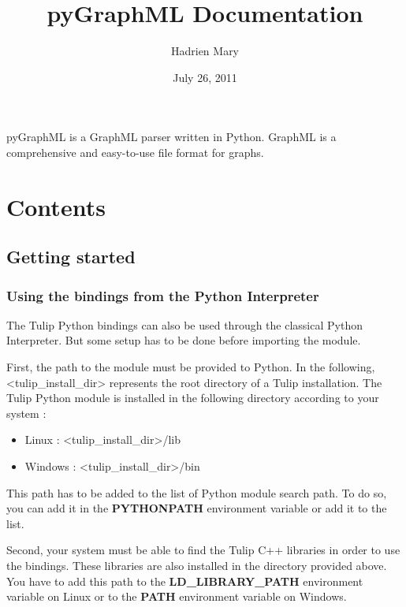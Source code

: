 \documentclass[letterpaper,10pt,english]{sphinxmanual}
\title{pyGraphML Documentation}
\date{July 26, 2011}
\author{Hadrien Mary}
\begin{document}
\maketitle
\tableofcontents
{}\label{index::doc}


pyGraphML is a GraphML parser written in Python. GraphML is a
comprehensive and easy-to-use file format for graphs.


\chapter{Contents}
\label{index:welcome-to-pygraphml-documentation}\label{index:contents}

\section{Getting started}
\label{gettingstarted:getting-started}\label{gettingstarted::doc}

\subsection{Using the bindings from the Python Interpreter}
\label{gettingstarted:using-the-bindings-from-the-python-interpreter}
The Tulip Python bindings can also be used through the classical Python Interpreter. But some setup has to be done
before importing the  module.

First, the path to the  module must be provided to Python.
In the following, \textless{}tulip\_install\_dir\textgreater{} represents the root directory of a Tulip installation.
The Tulip Python module is installed in the following directory according to your system :
\begin{itemize}
\item {} 
Linux : \textless{}tulip\_install\_dir\textgreater{}/lib

\item {} 
Windows : \textless{}tulip\_install\_dir\textgreater{}/bin

\end{itemize}

This path has to be added to the list of Python module search path. To do so, you can add it in the \textbf{PYTHONPATH}
environment variable or add it to the \href{http://docs.python.org/library/sys.html\#sys.path}{} list.

Second, your system must be able to find the Tulip C++ libraries in order to use the bindings. These libraries are
also installed in the directory provided above. You have to add this path to the \textbf{LD\_LIBRARY\_PATH} environment variable
on Linux or to the \textbf{PATH} environment variable on Windows.
\end{document}
